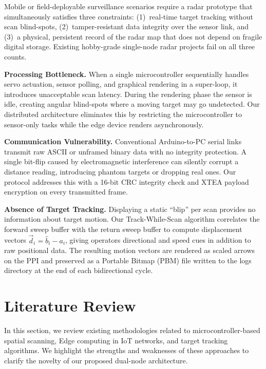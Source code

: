 \documentclass[14pt]{article}
\begin{document}
Mobile or field-deployable surveillance scenarios require a radar
prototype that simultaneously satisfies three constraints: (1)~real-time
target tracking without scan blind-spots, (2)~tamper-resistant data integrity
over the sensor link, and (3)~a physical, persistent record of the radar map
that does not depend on fragile digital storage. Existing hobby-grade
single-node radar projects fail on all three counts.

\textbf{Processing Bottleneck.} When a single microcontroller sequentially
handles servo actuation, sensor polling, and graphical rendering in a
super-loop, it introduces unacceptable scan latency. During the rendering phase
the sensor is idle, creating angular blind-spots where a moving target may go
undetected. Our distributed architecture eliminates this by restricting the
microcontroller to sensor-only tasks while the edge device renders
asynchronously.

\textbf{Communication Vulnerability.} Conventional Arduino-to-PC serial links
transmit raw ASCII or unframed binary data with no integrity protection. A
single bit-flip caused by electromagnetic interference can silently corrupt a
distance reading, introducing phantom targets or dropping real ones. Our
protocol addresses this with a 16-bit CRC integrity check and XTEA payload
encryption on every transmitted frame.

\textbf{Absence of Target Tracking.} Displaying a static ``blip'' per scan
provides no information about target motion. Our Track-While-Scan algorithm
correlates the forward sweep buffer with the return sweep buffer to compute
displacement vectors $\vec{d}_i = \hat{b}_i - a_i$, giving operators
directional and speed cues in addition to raw positional data. The resulting
motion vectors are rendered as scaled arrows on the PPI and preserved as a
Portable Bitmap (PBM) file written to the logs directory at the end of each
bidirectional cycle.



\section{Literature Review}
\iffalse
In this section, we review existing methodologies related to microcontroller-based spatial scanning, Edge computing in IoT networks, and target tracking algorithms. We highlight the strengths and weaknesses of these approaches to clarify the novelty of our proposed dual-node architecture.
\end{document}
